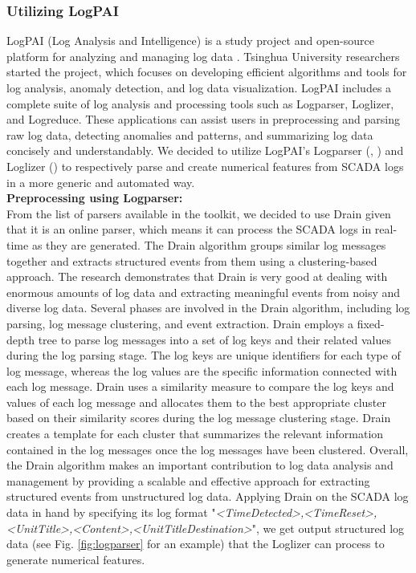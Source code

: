   \subsubsection{Utilizing LogPAI}
    LogPAI (Log Analysis and Intelligence) is a study project and open-source platform for analyzing and managing log data \cite{LogPAI}. 
    Tsinghua University researchers started the project, which focuses on developing efficient algorithms and tools for log analysis, anomaly detection, and log data visualization.
    LogPAI includes a complete suite of log analysis and processing tools such as Logparser, Loglizer, and Logreduce. 
    These applications can assist users in preprocessing and parsing raw log data, detecting anomalies and patterns, and summarizing log data concisely and understandably.
    We decided to utilize LogPAI's Logparser (\cite{Logparser_1}, \cite{Logparser_2}) and Loglizer (\cite{Loglizer}) to respectively parse and create numerical features from 
    SCADA logs in a more generic and automated way.\\
    \textbf{Preprocessing using Logparser:}\\
    From the list of parsers available in the toolkit, we decided to use Drain \cite{Drain} given that it is an online parser, which means it can process the SCADA logs 
    in real-time as they are generated. The Drain algorithm groups similar log messages together and extracts structured events from them using a 
    clustering-based approach. The research demonstrates that Drain is very good at dealing with enormous amounts of log data and extracting meaningful events from 
    noisy and diverse log data. Several phases are involved in the Drain algorithm, including log parsing, log message clustering, and event extraction. 
    Drain employs a fixed-depth tree to parse log messages into a set of log keys and their related values during the log parsing stage. The log keys 
    are unique identifiers for each type of log message, whereas the log values are the specific information connected with each log message. Drain uses a similarity measure 
    to compare the log keys and values of each log message and allocates them to the best appropriate cluster based on their similarity scores during the log message 
    clustering stage. Drain creates a template for each cluster that summarizes the relevant information contained in the log messages once the log messages have been clustered.
    Overall, the Drain algorithm makes an important contribution to log data analysis and management by providing a scalable and effective approach for extracting structured 
    events from unstructured log data.
    Applying Drain on the SCADA log data in hand by specifying its log format "\emph{<TimeDetected>,<TimeReset>,<UnitTitle>,<Content>,<UnitTitleDestination>}", we get 
    output structured log data (see Fig. \ref{fig:logparser} for an example) that the Loglizer can process to generate numerical features.

